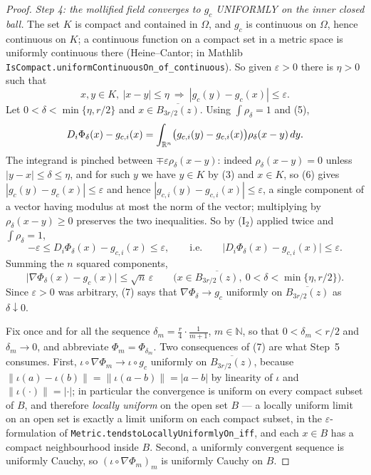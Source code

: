 \begin{proof}
\medskip
\noindent\emph{Step 4: the mollified field converges to $g_c$ UNIFORMLY on the
inner closed ball.}  The set $K$ is compact and contained in $\Omega$, and $g_c$
is continuous on $\Omega$, hence continuous on $K$; a continuous function on a
compact set in a metric space is uniformly continuous there (Heine--Cantor; in
Mathlib \texttt{IsCompact.uniformContinuousOn\_of\_continuous}).  So given $\varepsilon>0$
there is $\eta>0$ such that
\[
x,y\in K,\ |x-y|\le\eta\ \Longrightarrow\ |g_c(y)-g_c(x)|\le\varepsilon .
\tag{6}
\]
Let $0<\delta<\min\{\eta,r/2\}$ and $x\in\overline{B_{3r/2}(z)}$.  Using
$\int\rho_\delta=1$ and (5),
\[
D_i\Phi_\delta(x)-g_{c,i}(x)
=\int_{\mathbb{R}^n}\bigl(g_{c,i}(y)-g_{c,i}(x)\bigr)\rho_\delta(x-y)\,dy .
\]
The integrand is pinched between $\mp\varepsilon\rho_\delta(x-y)$: indeed
$\rho_\delta(x-y)=0$ unless $|y-x|\le\delta\le\eta$, and for such $y$ we have
$y\in K$ by (3) and $x\in K$, so (6) gives
$|g_c(y)-g_c(x)|\le\varepsilon$ and hence
$|g_{c,i}(y)-g_{c,i}(x)|\le\varepsilon$, a single component of a vector having
modulus at most the norm of the vector; multiplying by $\rho_\delta(x-y)\ge0$
preserves the two inequalities.  So by ($\mathrm I_2$) applied twice and
$\int\rho_\delta=1$,
\[
-\varepsilon\le D_i\Phi_\delta(x)-g_{c,i}(x)\le\varepsilon ,
\qquad\text{i.e.}\qquad
\bigl|D_i\Phi_\delta(x)-g_{c,i}(x)\bigr|\le\varepsilon .
\]
Summing the $n$ squared components,
\[
\bigl|\nabla\Phi_\delta(x)-g_c(x)\bigr|\le\sqrt n\,\varepsilon
\qquad\bigl(x\in\overline{B_{3r/2}(z)},\ 0<\delta<\min\{\eta,r/2\}\bigr).
\tag{7}
\]
Since $\varepsilon>0$ was arbitrary, (7) says that $\nabla\Phi_\delta\to g_c$
uniformly on $\overline{B_{3r/2}(z)}$ as $\delta\downarrow0$.

Fix once and for all the sequence $\delta_m=\tfrac r4\cdot\tfrac1{m+1}$,
$m\in\mathbb N$, so that $0<\delta_m<r/2$ and $\delta_m\to0$, and abbreviate
$\Phi_m=\Phi_{\delta_m}$.  Two consequences of (7) are what Step~5 consumes.
First, $\iota\circ\nabla\Phi_m\to\iota\circ g_c$ uniformly on
$\overline{B_{3r/2}(z)}$, because $\|\iota(a)-\iota(b)\|=\|\iota(a-b)\|=|a-b|$
by linearity of $\iota$ and $\|\iota(\cdot)\|=|\cdot|$; in particular the
convergence is uniform on every compact subset of $B$, and therefore
\emph{locally uniform} on the open set $B$ --- a locally uniform limit on an open
set is exactly a limit uniform on each compact subset, in the
$\varepsilon$-formulation of \texttt{Metric.tendstoLocallyUniformlyOn\_iff}, and
each $x\in B$ has a compact neighbourhood inside $B$.  Second, a uniformly
convergent sequence is uniformly Cauchy, so $(\iota\circ\nabla\Phi_m)_m$ is
uniformly Cauchy on $B$.


\end{proof}
